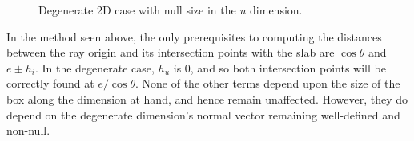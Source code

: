 \documentclass[a4paper,10pt]{article}
\begin{document}
\begin{figure}[ht]

\caption{Degenerate 2D case with null size in the $u$ dimension.}
\label{fig:degenerate_2d_1dim}
\end{figure}

In the method seen above, the only prerequisites to computing the distances between the ray origin and its intersection points with the slab are $\cos \theta$ and $e \pm h_i$. In the degenerate case, $h_u$ is 0, and so both intersection points will be correctly found at $e / \cos \theta$. None of the other terms depend upon the size of the box along the dimension at hand, and hence remain unaffected. However, they do depend on the degenerate dimension's normal vector remaining well-defined and non-null.

%


\end{document}
